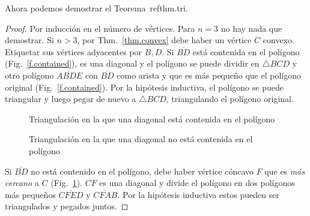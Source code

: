 Ahora podemos demostrar el Teorema~ref{thm.tri}.

\begin{proof}
Por inducción en el número de vértices. Para $n=3$ no hay nada que demostrar. Si $n>3$, por Thm.~\ref{thm.convex} debe haber un vértice $C$ convexo. Etiquetar sus vértices adyacentes por $B,D$. Si $\overline{BD}$ está contenida en el polígono (Fig.~\ref{f.contained}), es una diagonal y el polígono se puede dividir en $\triangle BCD$ y otro polígono $\overline{ABDE}$ con $\overline{BD}$ como arista y que es más pequeño que el polígono original (Fig.~\ref{f.contained}). Por la hipótesis inductiva, el polígono se puede triangular y luego pegar de nuevo a $\triangle BCD$, triangulando el polígono original.

\begin{figure}[t]
\begin{minipage}{.45\textwidth}
\begin{center}
\caption{Triangulación en la que una diagonal está contenida en el polígono}\label{f.contained}
\end{center}
\end{minipage}
\hfill
\begin{minipage}{.45\textwidth}
\begin{center}
\caption{Triangulación en la que una diagonal no está contenida en el polígono}\label{f.museum.concave-vertices}
\end{center}
\end{minipage}
\end{figure}

Si $\overline{BD}$ no está contenido en el polígono, debe haber vértice cóncavo $F$ que es \emph{más cercano} a $C$ (Fig.~\ref{f.museum.concave-vertices}). $\overline{CF}$ es una diagonal y divide el polígono en dos polígonos más pequeños $\overline{CFED}$ y $\overline{CFAB}$. Por la hipótesis inductiva estos pueden ser triangulados y pegados juntos.
\end{proof}

